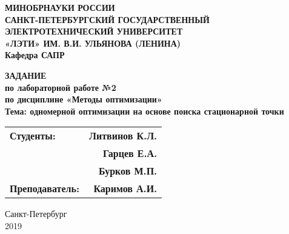 \documentclass[a4paper,12pt]{article}
\begin{document}
\thispagestyle{empty} %

\begin{centering}
	\textbf{
{\large МИНОБРНАУКИ РОССИИ\\
САНКТ-ПЕТЕРБУРГСКИЙ ГОСУДАРСТВЕННЫЙ\\
ЭЛЕКТРОТЕХНИЧЕСКИЙ УНИВЕРСИТЕТ\\
«ЛЭТИ» ИМ. В.И. УЛЬЯНОВА (ЛЕНИНА)\\
Кафедра САПР}\\
}
\end{centering}


\vspace{7cm}

\begin{centering}
\textbf{ {\large 
ЗАДАНИЕ\\
по лабораторной работе №2\\
по дисциплине «Методы оптимизации»\\
Тема:  одномерной оптимизации на основе поиска
стационарной точки\guillemotright\\
}}
\end{centering}

\vspace{4cm}

\begin{tabular}{l r}
    \textbf{ {\large Студенты:}}&\hspace{6cm} \textbf{ {\large Литвинов К.Л.}}\\
   \textbf{}&\hspace{6cm} \textbf{ {\large Гарцев Е.А.}}\\
   \textbf{{}}&\hspace{6cm} \textbf{\large{Бурков М.П.}}\\
    \textbf{ {\large Преподаватель:}}&\hspace{6cm} \textbf{ {\large Каримов А.И.}}\\
\end{tabular}

\vspace{6cm}


\begin{centering}
	{\large
Санкт-Петербург \\
2019 \\
}
\end{centering}
\end{document}
